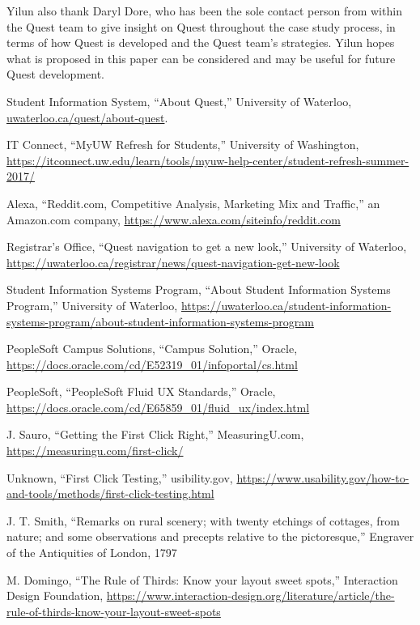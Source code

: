 \documentclass[conference]{IEEEtran}
\begin{document}
Yilun also thank Daryl Dore, who has been the sole contact person from within the Quest team to give insight on Quest throughout the case study process, in terms of how Quest is developed and the Quest team's strategies. Yilun hopes what is proposed in this paper can be considered and may be useful for future Quest development.


\begin{thebibliography}{00}

 Student Information System, ``About Quest,'' University of Waterloo, \url{uwaterloo.ca/quest/about-quest}.

 IT Connect, ``MyUW Refresh for Students,''  University of Washington, \url{https://itconnect.uw.edu/learn/tools/myuw-help-center/student-refresh-summer-2017/}

 Alexa, ``Reddit.com, Competitive Analysis, Marketing Mix and Traffic,'' an Amazon.com company, \url{https://www.alexa.com/siteinfo/reddit.com}

 Registrar's Office, ``Quest navigation to get a new look,'' University of Waterloo, \url{https://uwaterloo.ca/registrar/news/quest-navigation-get-new-look} 

 Student Information Systems Program, ``About Student Information Systems Program,'' University of Waterloo, \url{https://uwaterloo.ca/student-information-systems-program/about-student-information-systems-program}

 PeopleSoft Campus Solutions, ``Campus Solution,'' Oracle, \url{https://docs.oracle.com/cd/E52319\_01/infoportal/cs.html}

 PeopleSoft, ``PeopleSoft Fluid UX Standards,'' Oracle, \url{https://docs.oracle.com/cd/E65859\_01/fluid\_ux/index.html}

 J. Sauro, ``Getting the First Click Right,'' MeasuringU.com, \url{https://measuringu.com/first-click/}

 Unknown, ``First Click Testing,'' usibility.gov, \url{https://www.usability.gov/how-to-and-tools/methods/first-click-testing.html}

 J. T. Smith, ``Remarks on rural scenery; with twenty etchings of cottages, from nature; and some observations and precepts relative to the pictoresque,'' Engraver of the Antiquities of London, 1797

 M. Domingo, ``The Rule of Thirds: Know your layout sweet spots,'' Interaction Design Foundation, \url{https://www.interaction-design.org/literature/article/the-rule-of-thirds-know-your-layout-sweet-spots}


\end{thebibliography}
\end{document}
